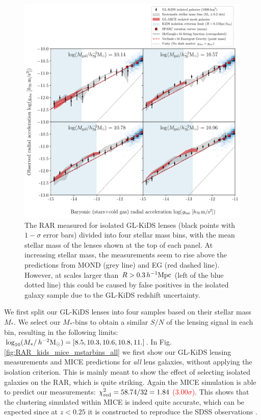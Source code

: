 \documentclass[usenatbib]{mnras}
\newcommand{\hmsun}{\,h^{-2} {\rm M_\odot}}
\newcommand{\hMpc}{\, h^{-1}{\rm{Mpc}} }
\newcommand{\un}[1]{_{\rm #1}}
\begin{document}
\begin{figure}
	\includegraphics[width=\textwidth]{Figures/RAR_KiDS+MICE+Verlinde_4-massbins_isolated.pdf}
	\caption{The RAR measured for isolated GL-KiDS lenses (black points with $1-\sigma$ error bars) divided into four stellar mass bins, with the mean stellar mass of the lenses shown at the top of each panel. At increasing stellar mass, the measurements seem to rise above the predictions from MOND (grey line) and EG (red dashed line). However, at scales larger than $R > 0.3 \hMpc$ (left of the blue dotted line) this could be caused by false positives in the isolated galaxy sample due to the GL-KiDS redshift uncertainty.}
	\label{fig:RAR_kids_mice_mstarbins}
\end{figure}

We first split our GL-KiDS lenses into four samples based on their stellar mass $M_*$. We select our $M_*$-bins to obtain a similar $S/N$ of the lensing signal in each bin, resulting in the following limits: $\log_{10}(M_*/\hmsun) = [8.5,10.3,10.6,10.8,11.]$. In Fig. \ref{fig:RAR_kids_mice_mstarbins_all} we first show our GL-KiDS lensing measurements and MICE predictions for \emph{all} lens galaxies, without applying the isolation criterion. This is mainly meant to show the effect of selecting isolated galaxies on the RAR, which is quite striking. Again the MICE simulation is able to predict our measurements: \textcolor{red}{$\chi\un{red}^2 = 58.74 / 32 = 1.84$ ($3.00 \sigma$)}. This shows that the clustering simulated within MICE is indeed quite accurate, which can be expected since at $z<0.25$ it is constructed to reproduce the SDSS observations \cite[]{zehavi2011}.
\end{document}
